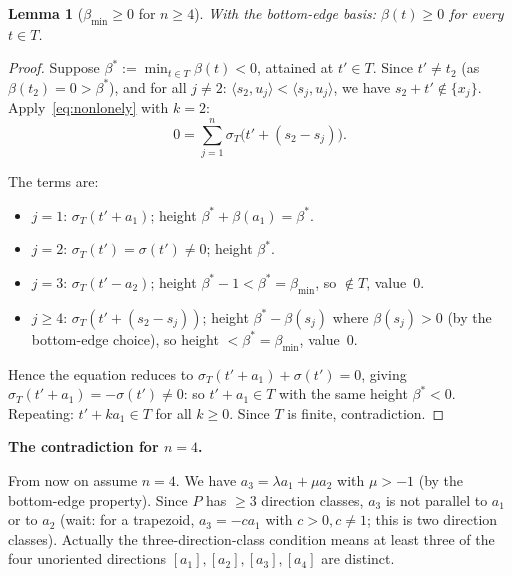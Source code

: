 \documentclass{article}
\newtheorem{lemma}{Lemma}
\begin{document}
\begin{lemma}[$\beta_{\min}\ge 0$ for $n\ge 4$]\label{lem:betamin4}
With the bottom-edge basis: $\beta(t)\ge 0$ for every $t\in T$.
\end{lemma}
\begin{proof}
Suppose $\beta^*:=\min_{t\in T}\beta(t)<0$, attained at $t'\in T$.
Since $t'\ne t_2$ (as $\beta(t_2)=0>\beta^*$), and for all $j\ne 2$:
$\langle s_2,u_j\rangle<\langle s_j,u_j\rangle$, we have $s_2+t'\notin\{x_j\}$.
Apply~\eqref{eq:nonlonely} with $k=2$:
\[
  0 = \sum_{j=1}^n \sigma_T\!\bigl(t'+(s_2-s_j)\bigr).
\]

The terms are:
\begin{itemize}
\item $j=1$: $\sigma_T(t'+a_1)$; height $\beta^*+\beta(a_1)=\beta^*$.
\item $j=2$: $\sigma_T(t')=\sigma(t')\ne 0$; height $\beta^*$.
\item $j=3$: $\sigma_T(t'-a_2)$; height $\beta^*-1<\beta^*=\beta_{\min}$, so $\notin T$, value~$0$.
\item $j\ge 4$: $\sigma_T(t'+(s_2-s_j))$; height $\beta^*-\beta(s_j)$ where $\beta(s_j)>0$
  (by the bottom-edge choice), so height $<\beta^*=\beta_{\min}$, value~$0$.
\end{itemize}

Hence the equation reduces to $\sigma_T(t'+a_1)+\sigma(t')=0$, giving
$\sigma_T(t'+a_1)=-\sigma(t')\ne 0$: so $t'+a_1\in T$ with the same height
$\beta^*<0$.  Repeating: $t'+ka_1\in T$ for all $k\ge 0$.
Since $T$ is finite, contradiction.
\end{proof}

\medskip
\noindent\textbf{The contradiction for $n=4$.}

From now on assume $n=4$.  We have $a_3=\lambda a_1+\mu a_2$ with
$\mu>-1$ (by the bottom-edge property).  Since $P$ has $\ge 3$ direction classes,
$a_3$ is not parallel to $a_1$ or to $a_2$ (wait: for a trapezoid,
$a_3=-ca_1$ with $c>0,c\ne 1$; this is two direction classes).
Actually the three-direction-class condition means at least three of the four
unoriented directions $[a_1],[a_2],[a_3],[a_4]$ are distinct.
\end{document}
